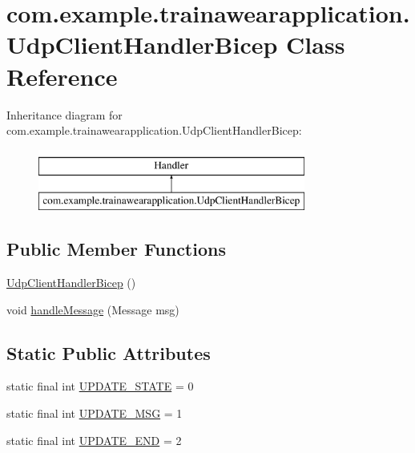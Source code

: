 \hypertarget{classcom_1_1example_1_1trainawearapplication_1_1_udp_client_handler_bicep}{}\section{com.\+example.\+trainawearapplication.\+Udp\+Client\+Handler\+Bicep Class Reference}
\label{classcom_1_1example_1_1trainawearapplication_1_1_udp_client_handler_bicep}
Inheritance diagram for com.\+example.\+trainawearapplication.\+Udp\+Client\+Handler\+Bicep\+:\begin{figure}[H]
\begin{center}
\leavevmode
\includegraphics[height=2.000000cm]{classcom_1_1example_1_1trainawearapplication_1_1_udp_client_handler_bicep}
\end{center}
\end{figure}
\subsection*{Public Member Functions}
\begin{DoxyCompactItemize}
\item 
\mbox{\hyperlink{classcom_1_1example_1_1trainawearapplication_1_1_udp_client_handler_bicep_afa5c7cacbf23c1527423e8bf7c22abe1}{Udp\+Client\+Handler\+Bicep}} ()
\item 
void \mbox{\hyperlink{classcom_1_1example_1_1trainawearapplication_1_1_udp_client_handler_bicep_a083761d7050084ba7f64723dc178487a}{handle\+Message}} (Message msg)
\end{DoxyCompactItemize}
\subsection*{Static Public Attributes}
\begin{DoxyCompactItemize}
\item 
static final int \mbox{\hyperlink{classcom_1_1example_1_1trainawearapplication_1_1_udp_client_handler_bicep_aac92af19ef7bcdbebc31e78e1822bf61}{U\+P\+D\+A\+T\+E\+\_\+\+S\+T\+A\+TE}} = 0
\item 
static final int \mbox{\hyperlink{classcom_1_1example_1_1trainawearapplication_1_1_udp_client_handler_bicep_a4b12d585b9f99f7364e4295fd18e494e}{U\+P\+D\+A\+T\+E\+\_\+\+M\+SG}} = 1
\item 
static final int \mbox{\hyperlink{classcom_1_1example_1_1trainawearapplication_1_1_udp_client_handler_bicep_a70806fb9d5d3e9626218321b083d9b36}{U\+P\+D\+A\+T\+E\+\_\+\+E\+ND}} = 2
\end{DoxyCompactItemize}

